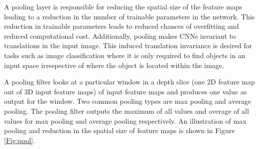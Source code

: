 A pooling layer is responsible for reducing the spatial size of the feature maps leading to a reduction in the number of trainable parameters in the network. This reduction in trainable parameters leads to reduced chances of overfitting and reduced computational cost. Additionally, pooling makes CNNs invariant to translations in the input image. This induced translation invariance is desired for tasks such as image classification where it is only required to find objects in an input space irrespective of where the object is located within the image. 

A pooling filter looks at a particular window in a depth slice (one 2D feature map out of 3D input feature maps) of input feature maps and produces one value as output for the window. Two common pooling types are max pooling and average pooling. The pooling filter outputs the maximum of all values and average of all values for max pooling and average pooling respectively. An illustration of max pooling and reduction in the spatial size of feature maps is shown in Figure \ref{Fig:pool}.

